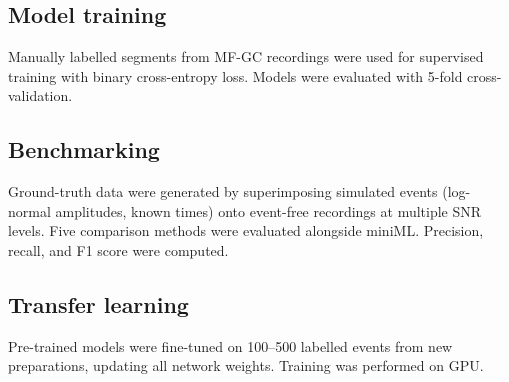 \documentclass[11pt]{article}
\begin{document}
\subsection{Model training}
Manually labelled segments from MF-GC recordings were used for supervised training with binary cross-entropy loss. Models were evaluated with 5-fold cross-validation.

\subsection{Benchmarking}
Ground-truth data were generated by superimposing simulated events (log-normal amplitudes, known times) onto event-free recordings at multiple SNR levels. Five comparison methods were evaluated alongside miniML. Precision, recall, and F1 score were computed.

\subsection{Transfer learning}
Pre-trained models were fine-tuned on 100--500 labelled events from new preparations, updating all network weights. Training was performed on GPU.


\end{document}
